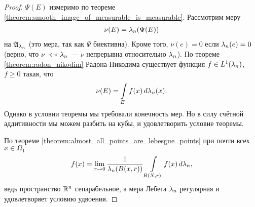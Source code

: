 \begin{proof}
 $\Psi(E)$ измеримо по теореме \ref{theorem:smooth_image_of_measurable_is_measurable}. Рассмотрим меру
 \begin{align*}
  \nu(E) = \lambda_n(\Psi(E))
 \end{align*} на $\mathfrak{A}_{\lambda_n}$ (это мера, так как $\Psi$ биективна). Кроме того, $\nu(e) = 0$  если $\lambda_n(e) = 0$ (верно, что $\nu \prec \prec \lambda_n$ --- $\nu$ непрерывна относительно $\lambda_n$). По теореме \ref{theorem:radon_nikodim} Радона-Никодима существует функция $f \in L^{1}(\lambda_n)$, $f \geqslant 0$  такая, что \begin{align*}
  \nu(E) = \int\limits_{E} f(x) \, d\lambda_n(x)  
 .\end{align*} Однако в условии теоремы мы требовали конечность мер. Но в силу счётной аддитивности мы можем разбить на кубы, и удовлетворить условие теоремы.

 По теореме \ref{theorem:almost_all_points_are_lebesgue_points} при почти всех $x \in \Omega_1$ \begin{align}
  \label{eq1:theorem:measure_of_smooth_image}
  f(x) = \lim_{r \to 0} \frac{1}{\lambda_n(B(x, r))} \int\limits_{B(X, r)} f(x) \, d\lambda_n  
 ,\end{align} ведь пространство $\mathbb{R}^{n}$ сепарабельное, а мера Лебега $\lambda_n$ регулярная и удовлетворяет условию удвоения.


\end{proof}
